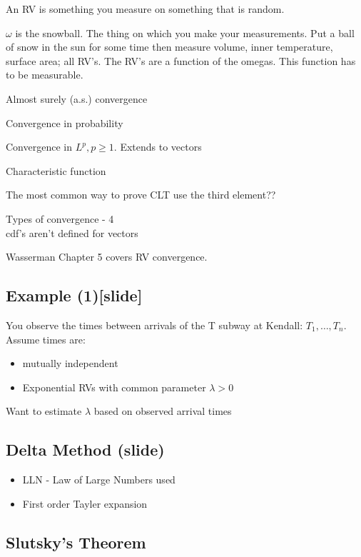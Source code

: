 
An RV is something you measure on something that is random.

$\omega$ is the snowball.  The thing on which you make your measurements.  Put a ball of snow in the sun for some time then measure volume, inner temperature, surface area; all RV's.  The RV's are a function of the omegas.  This function has to be measurable.

Almost surely (a.s.) convergence


Convergence in probability

Convergence in $L^p, p \ge 1$.  Extends to vectors

Characteristic function

The most common way to prove CLT use the third element??

Types of convergence - 4\\
 cdf's aren't defined for vectors

Wasserman Chapter 5 covers RV convergence.

\subsection{Example (1)[slide]}


You observe the times between arrivals of the T subway at Kendall: $T_1,\ldots,T_n$.  Assume times are:

\begin{itemize}
    \item mutually independent
    \item Exponential RVs with common parameter $\lambda>0$
\end{itemize}

Want to estimate $\lambda$ based on observed arrival times

\subsection{Delta Method (slide)}


\begin{itemize}
    \item LLN - Law of Large Numbers used
    \item First order Tayler expansion
\end{itemize}

\subsection{Slutsky's Theorem}



